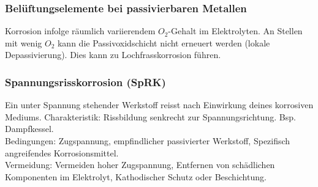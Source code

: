 \subsubsection{Belüftungselemente bei passivierbaren Metallen}
Korrosion infolge räumlich variierendem $O_2$-Gehalt im Elektrolyten. An Stellen mit wenig $O_2$ kann die Passivoxidschicht nicht erneuert werden (lokale Depassivierung). Dies kann zu Lochfrasskorrosion führen. 

\subsubsection{Spannungsrisskorrosion (SpRK)}
Ein unter Spannung stehender Werkstoff reisst nach Einwirkung deines korrosiven Mediums. Charakteristik: Rissbildung senkrecht zur Spannungsrichtung. Bsp. Dampfkessel. \\

Bedingungen: Zugspannung, empfindlicher passivierter Werkstoff, Spezifisch angreifendes Korrosionsmittel. \\
Vermeidung: Vermeiden hoher Zugspannung, Entfernen von schädlichen Komponenten im Elektrolyt, Kathodischer Schutz oder Beschichtung.


